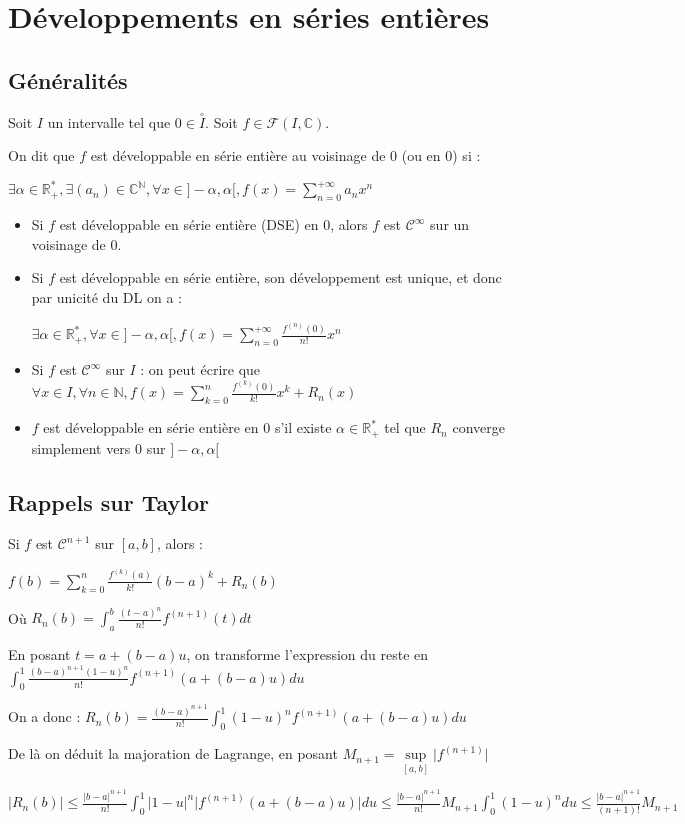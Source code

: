 \documentclass[a4paper,12pt]{book}
\newcommand{\Def}[2]{\begin{tcolorbox}[sharp corners, colback=white,colframe=blue!90!black!75, title=Définition : #1]#2\end{tcolorbox}}
\newcommand{\Thr}[2]{\begin{tcolorbox}[sharp corners, colback=white,colframe=red!90!black!75, title=Théorème : #1]#2\end{tcolorbox}}
\newcommand{\Prop}[2]{\begin{tcolorbox}[sharp corners, colback=white,colframe=red!90!black!75, title=Proposition : #1]#2\end{tcolorbox}}
\def\R{\mathbb{R}}
\def\C{\mathbb{C}}
\def\N{\mathbb{N}}
\begin{document}
\section{Développements en séries entières}
\subsection{Généralités}
\Def{Développement en série entière}{Soit $I$ un intervalle tel que $0\in\overset{\circ}{I}$. Soit $f\in\mathcal{F}(I,\C)$. \par On dit que $f$ est développable en série entière au voisinage de $0$ (ou en $0$) si :
\par $\exists\alpha\in\R_+^*,\exists (a_n)\in\C^\N, \forall x\in]-\alpha, \alpha[, f(x)=\sum\limits_{n=0}^{+\infty}a_nx^n$}
\Prop{}{\begin{itemize}
\item Si $f$ est développable en série entière (DSE) en $0$, alors $f$ est $\mathcal{C}^\infty$ sur un voisinage de $0$.
\item Si $f$ est développable en série entière, son développement est unique, et donc par unicité du DL on a :\par $\exists\alpha\in\R_+^*, \forall x\in]-\alpha,\alpha[, f(x)=\sum\limits_{n=0}^{+\infty}\frac{f^{(n)}(0)}{n!}x^n$
\item Si $f$ est $\mathcal{C}^\infty$ sur $I$ : on peut écrire que $\forall x\in I, \forall n\in\N, f(x) = \sum\limits_{k=0}^n \frac{f^{(k)}(0)}{k!}x^k + R_n(x)$
\item $f$ est développable en série entière en $0$ s'il existe $\alpha\in\R_+^*$ tel que $R_n$ converge simplement vers $0$ sur $]-\alpha, \alpha[$
\end{itemize}}

\subsection{Rappels sur Taylor}
\Thr{Taylor-Reste-Intégral}{Si $f$ est $\mathcal{C}^{n+1}$ sur $[a,b]$, alors : \par \begin{center} $f(b) = \sum\limits_{k=0}^n \frac{f^{(k)}(a)}{k!}(b-a)^k + R_n(b)$\end{center} \par Où $R_n(b) = \int_a^b\frac{(t-a)^n}{n!}f^{(n+1)}(t)dt$}
\Thr{Taylor-Lagrange}{En posant $t = a+(b-a)u$, on transforme l'expression du reste en $\int_0^1\frac{(b-a)^{n+1}(1-u)^n}{n!}f^{(n+1)}(a+(b-a)u)du$ \par On a donc : $R_n(b) = \frac{(b-a)^{n+1}}{n!}\int_0^1(1-u)^nf^{(n+1)}(a+(b-a)u)du$ \par De là on déduit la majoration de Lagrange, en posant $M_{n+1} = \sup\limits_{[a,b]}\vert f^{(n+1)}\vert$
\par $\vert R_n(b)\vert \leq \frac{\vert b-a\vert^{n+1}}{n!}\int_0^1\vert 1-u\vert^n\vert f^{(n+1)}(a+(b-a)u)\vert du \leq \frac{\vert b-a\vert^{n+1}}{n!}M_{n+1}\int_0^1(1-u)^ndu\leq \frac{\vert b-a\vert^{n+1}}{(n+1)!}M_{n+1}$}
\end{document}
